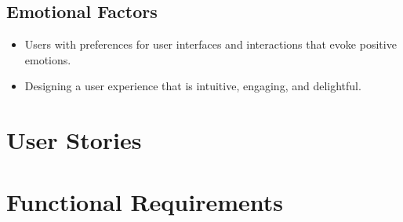 \documentclass[12pt]{article}
\begin{document}
\subsection{Emotional Factors}
\begin{itemize}
  \item Users with preferences for user interfaces and interactions that evoke positive emotions.
  \item Designing a user experience that is intuitive, engaging, and delightful.
\end{itemize}

\newpage
















\section{User Stories}

\newpage

\section{Functional Requirements}
\end{document}
